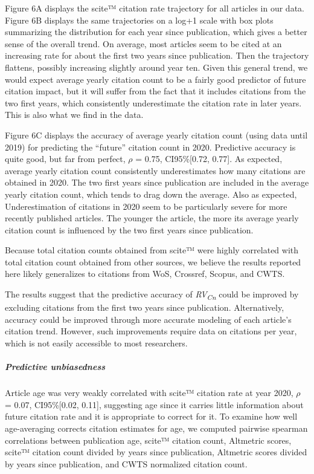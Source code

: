 \documentclass[
  english,
  man,floatsintext]{apa6}
\let\oldsubparagraph\subparagraph
\renewcommand{\subparagraph}[1]{\oldsubparagraph{#1}\mbox{}}
\begin{document}
Figure 6A displays the scite™ citation rate trajectory for all articles in our data. Figure 6B displays the same trajectories on a log+1 scale with box plots summarizing the distribution for each year since publication, which gives a better sense of the overall trend. On average, most articles seem to be cited at an increasing rate for about the first two years since publication. Then the trajectory flattens, possibly increasing slightly around year ten. Given this general trend, we would expect average yearly citation count to be a fairly good predictor of future citation impact, but it will suffer from the fact that it includes citations from the two first years, which consistently underestimate the citation rate in later years. This is also what we find in the data.

Figure 6C displays the accuracy of average yearly citation count (using data until 2019) for predicting the ``future'' citation count in 2020. Predictive accuracy is quite good, but far from perfect, \(\rho\) = 0.75, CI95\%{[}0.72, 0.77{]}. As expected, average yearly citation count consistently underestimates how many citations are obtained in 2020. The two first years since publication are included in the average yearly citation count, which tends to drag down the average. Also as expected, Underestimation of citations in 2020 seem to be particularly severe for more recently published articles. The younger the article, the more its average yearly citation count is influenced by the two first years since publication.

Because total citation counts obtained from scite™ were highly correlated with total citation count obtained from other sources, we believe the results reported here likely generalizes to citations from WoS, Crossref, Scopus, and CWTS.

The results suggest that the predictive accuracy of \emph{RV\textsubscript{Cn}} could be improved by excluding citations from the first two years since publication. Alternatively, accuracy could be improved through more accurate modeling of each article's citation trend. However, such improvements require data on citations per year, which is not easily accessible to most researchers.

\hypertarget{predictive-unbiasedness}{%
\subparagraph{Predictive unbiasedness}\label{predictive-unbiasedness}}

Article age was very weakly correlated with scite™ citation rate at year 2020, \(\rho\) = 0.07, CI95\%{[}0.02, 0.11{]}, suggesting age since it carries little information about future citation rate and it is appropriate to correct for it. To examine how well age-averaging corrects citation estimates for age, we computed pairwise spearman correlations between publication age, scite™ citation count, Altmetric scores, scite™ citation count divided by years since publication, Altmetric scores divided by years since publication, and CWTS normalized citation count.
\end{document}
